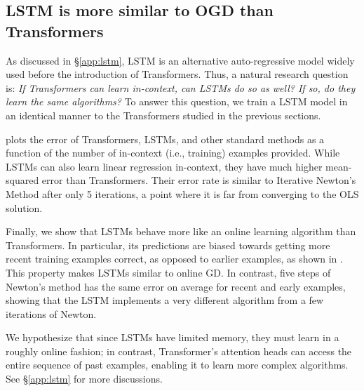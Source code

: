 \vspace{-1mm}
\subsection{LSTM is more similar to OGD than Transformers} \label{ssec:lstm}
\vspace{-1mm}

As discussed in \S\ref{app:lstm}, LSTM is an alternative auto-regressive model widely used before the introduction of Transformers. 
Thus, a natural research question is: \textit{If Transformers can learn in-context, can LSTMs do so as well? If so, do they learn the same algorithms?} To answer this question, we train a LSTM model in an identical manner to the Transformers studied in the previous sections.

 plots the error of Transformers, LSTMs, and other standard methods as a function of the number of in-context (i.e., training) examples provided.
While LSTMs can also learn linear regression in-context, they have much higher mean-squared error than Transformers.
Their error rate is similar to Iterative Newton's Method after only 5 iterations, a point where it is far from converging to the OLS solution.

Finally, we show that LSTMs behave more like an online learning algorithm than Transformers.
In particular, its predictions are biased towards getting more recent training examples correct, as opposed to earlier examples, as shown in .
This property makes LSTMs similar to online GD.
In contrast, five steps of Newton's method has the same error on average for recent and early examples, showing that the LSTM implements a very different algorithm from a few iterations of Newton.

We hypothesize that since LSTMs have limited memory, they must learn in a roughly online fashion;
in contrast, Transformer's attention heads can access the entire sequence of past examples, enabling it to learn more complex algorithms. See \S \ref{app:lstm} for more discussions.


